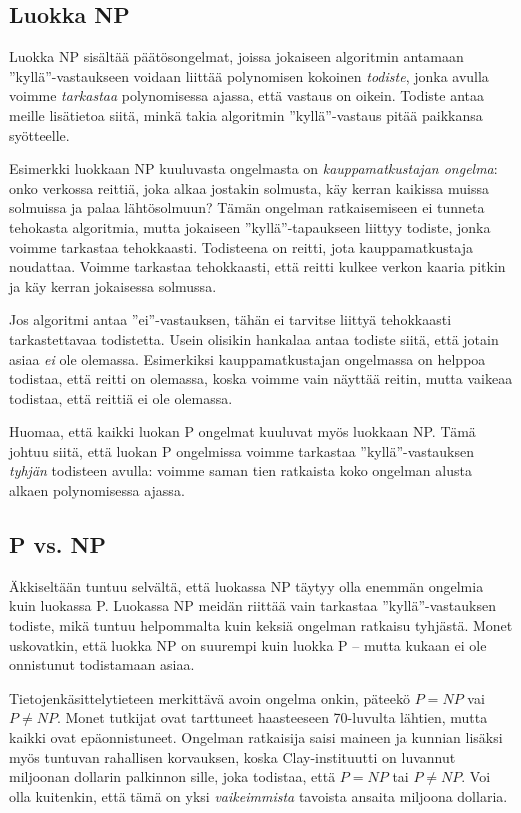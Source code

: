 \subsection{Luokka NP}

Luokka NP sisältää päätösongelmat, joissa jokaiseen
algoritmin antamaan ''kyllä''-vastaukseen voidaan liittää
polynomisen kokoinen \emph{todiste}, jonka avulla voimme
\emph{tarkastaa} polynomisessa ajassa, että vastaus on oikein.
Todiste antaa meille lisätietoa siitä,
minkä takia algoritmin ''kyllä''-vastaus
pitää paikkansa syötteelle.

Esimerkki luokkaan NP kuuluvasta ongelmasta on
\emph{kauppamatkustajan ongelma}: onko verkossa reittiä,
joka alkaa jostakin solmusta, käy kerran kaikissa muissa
solmuissa ja palaa lähtösolmuun?
Tämän ongelman ratkaisemiseen ei tunneta tehokasta algoritmia,
mutta jokaiseen ''kyllä''-tapaukseen liittyy todiste,
jonka voimme tarkastaa tehokkaasti.
Todisteena on reitti, jota kauppamatkustaja noudattaa.
Voimme tarkastaa tehokkaasti, että reitti kulkee verkon
kaaria pitkin ja käy kerran jokaisessa solmussa.

Jos algoritmi antaa ''ei''-vastauksen, tähän ei tarvitse
liittyä tehokkaasti tarkastettavaa todistetta.
Usein olisikin hankalaa antaa todiste siitä, että jotain
asiaa \emph{ei} ole olemassa.
Esimerkiksi kauppamatkustajan ongelmassa on helppoa
todistaa, että reitti on olemassa, koska voimme vain
näyttää reitin, mutta vaikeaa todistaa, että reittiä ei ole olemassa.

Huomaa, että kaikki luokan P ongelmat kuuluvat myös
luokkaan NP. Tämä johtuu siitä, että luokan P ongelmissa
voimme tarkastaa ''kyllä''-vastauksen
\emph{tyhjän} todisteen avulla: voimme saman tien ratkaista
koko ongelman alusta alkaen polynomisessa ajassa.

\subsection{P vs. NP}

Äkkiseltään tuntuu selvältä, että luokassa NP täytyy olla
enemmän ongelmia kuin luokassa P.
Luokassa NP meidän riittää vain tarkastaa ''kyllä''-vastauksen
todiste, mikä tuntuu helpommalta kuin keksiä ongelman ratkaisu tyhjästä.
Monet uskovatkin, että luokka NP on suurempi kuin luokka P --
mutta kukaan ei ole onnistunut todistamaan asiaa.

Tietojenkäsittelytieteen merkittävä avoin ongelma onkin,
päteekö $P=NP$ vai $P \neq NP$.
Monet tutkijat ovat tarttuneet haasteeseen
70-luvulta lähtien, mutta kaikki ovat epäonnistuneet.
Ongelman ratkaisija saisi maineen ja kunnian lisäksi
myös tuntuvan rahallisen korvauksen, koska
Clay-instituutti on luvannut miljoonan dollarin palkinnon
sille, joka todistaa, että $P=NP$ tai $P \neq NP$.
Voi olla kuitenkin, että tämä on yksi \emph{vaikeimmista}
tavoista ansaita miljoona dollaria.

